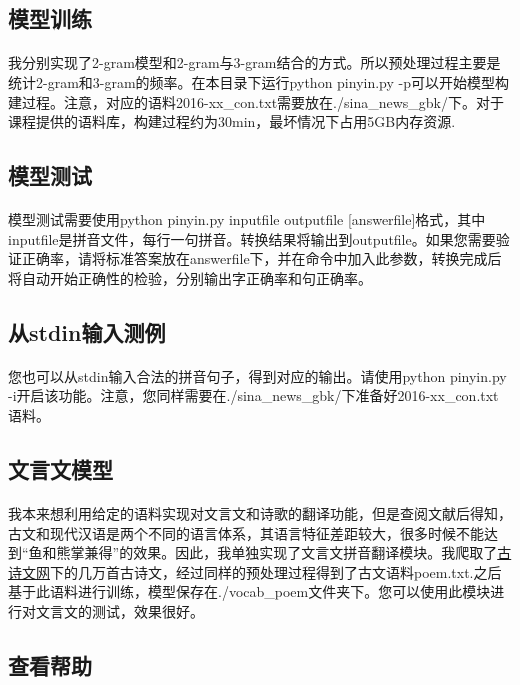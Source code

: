 \documentclass[UTF8, onecolumn, a4paper]{article}
\begin{document}
\subsection{模型训练}
\paragraph*{}
我分别实现了2-gram模型和2-gram与3-gram结合的方式。所以预处理过程主要是统计2-gram和3-gram的频率。在本目录下运行python pinyin.py -p可以开始模型构建过程。注意，对应的语料2016-xx\_con.txt需要放在./sina\_news\_gbk/下。对于课程提供的语料库，构建过程约为30min，最坏情况下占用5GB内存资源.
\subsection{模型测试}
\paragraph*{}
模型测试需要使用python pinyin.py inputfile outputfile [answerfile]格式，其中inputfile是拼音文件，每行一句拼音。转换结果将输出到outputfile。如果您需要验证正确率，请将标准答案放在answerfile下，并在命令中加入此参数，转换完成后将自动开始正确性的检验，分别输出字正确率和句正确率。
\subsection{从stdin输入测例}
\paragraph*{}
您也可以从stdin输入合法的拼音句子，得到对应的输出。请使用python pinyin.py -i开启该功能。注意，您同样需要在./sina\_news\_gbk/下准备好2016-xx\_con.txt语料。
\subsection{文言文模型}
\paragraph*{}
我本来想利用给定的语料实现对文言文和诗歌的翻译功能，但是查阅文献后得知，古文和现代汉语是两个不同的语言体系，其语言特征差距较大，很多时候不能达到“鱼和熊掌兼得”的效果。因此，我单独实现了文言文拼音翻译模块。我爬取了\href{https://www.gushiwen.org/}{古诗文网}下的几万首古诗文，经过同样的预处理过程得到了古文语料poem.txt.之后基于此语料进行训练，模型保存在./vocab\_poem文件夹下。您可以使用此模块进行对文言文的测试，效果很好。
\subsection{查看帮助}
\end{document}
